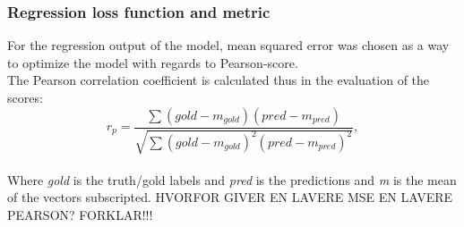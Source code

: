 \subsubsection*{Regression loss function and metric}
For the regression output of the model, mean squared error was chosen as a way to optimize the model with regards to Pearson-score.\\
The Pearson correlation coefficient is calculated thus in the evaluation of the scores:\\
\begin{equation} \label{eq:pearson}
r_{p} = \dfrac{\sum \left(gold-m_{gold}\right) \left(pred-m_{pred}\right)}{\sqrt{\sum \left(gold-m_{gold}\right)^{2} \left(pred-m_{pred}\right)^{2}}},
\end{equation}\\
Where \textit{gold} is the truth/gold labels and \textit{pred} is the predictions and \textit{m} is the mean of the vectors subscripted. HVORFOR GIVER EN LAVERE MSE EN LAVERE PEARSON? FORKLAR!!!

